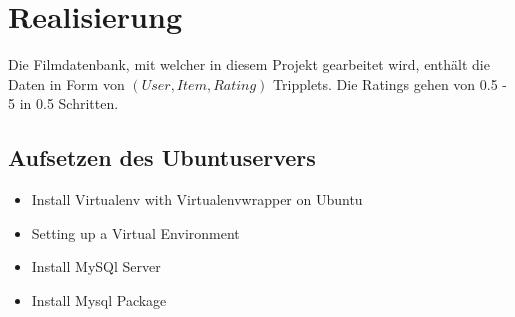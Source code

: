 \chapter{Realisierung}
Die Filmdatenbank, mit welcher in diesem Projekt gearbeitet wird, enthält die Daten in Form von $(User, Item, Rating)$ Tripplets. Die Ratings gehen von 0.5 - 5 in 0.5 Schritten.

\section{Aufsetzen des Ubuntuservers}
\begin{itemize}
    \item Install Virtualenv with Virtualenvwrapper on Ubuntu
    \item Setting up a Virtual Environment
    \item Install MySQl Server
    \item Install Mysql Package
\end{itemize}

